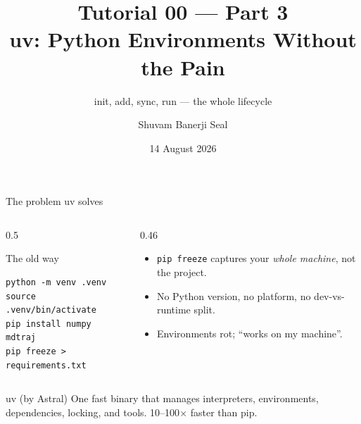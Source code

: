 \documentclass[aspectratio=169]{beamer}
\title[uv Environments]{Tutorial 00 --- Part 3\\[2pt] uv: Python Environments Without the Pain}
\subtitle{init, add, sync, run --- the whole lifecycle}
\author[SBS]{Shuvam Banerji Seal}
\institute[CH4114]{CH4114 --- Molecular Simulation}
\date[Aug 2026]{14 August 2026}
\begin{document}
\begin{frame}[plain]
  \titlepage
  \par
  \vspace{0.1cm}
\end{frame}

\begin{frame}[fragile]{The problem uv solves}
  \begin{columns}[T]
    \begin{column}{0.5\textwidth}
      \begin{block}{The old way}
        \begin{lstlisting}
python -m venv .venv
source .venv/bin/activate
pip install numpy mdtraj
pip freeze > requirements.txt
        \end{lstlisting}
      \end{block}
    \end{column}
    \begin{column}{0.46\textwidth}
      \begin{itemize}
        \item \texttt{pip freeze} captures your \emph{whole machine}, not the project.
        \item No Python version, no platform, no dev-vs-runtime split.
        \item Environments rot; ``works on my machine''.
      \end{itemize}
    \end{column}
  \end{columns}
  \vspace{0.2cm}
  \begin{block}{uv (by Astral)}
    One fast binary that manages interpreters, environments, dependencies,
    locking, and tools. 10--100$\times$ faster than pip.
  \end{block}
\end{frame}
\end{document}

